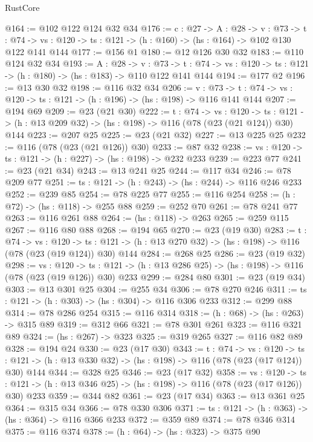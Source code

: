 \begin{lexlean}{RustCore}
\begin{coremodule}
@164 := @102 @122 @124 @32 @34
@176 := {c : @27} ->
  {A : @28} ->
  {v : @73} ->
  {t : @74} -> {vs : @120} -> {ts : @121} -> (h : @160) -> (hs : @164) -> @102 @130 @122 @141 @144
@177 := @156 @1
@180 := @12 @126 @30 @32
@183 := @110 @124 @32 @34
@193 := {A : @28} ->
  {v : @73} ->
  {t : @74} -> {vs : @120} -> {ts : @121} -> (h : @180) -> (hs : @183) -> @110 @122 @141 @144
@194 := @177 @2
@196 := @13 @30 @32
@198 := @116 @32 @34
@206 := {v : @73} ->
  {t : @74} -> {vs : @120} -> {ts : @121} -> (h : @196) -> (hs : @198) -> @116 @141 @144
@207 := @194 @69
@209 := @23 (@21 @30)
@222 := {t : @74} ->
  {vs : @120} ->
  {ts : @121} -> (h : @13 @209 @32) -> (hs : @198) -> @116 (@78 (@23 (@21 @124)) @30) @144
@223 := @207 @25
@225 := @23 (@21 @32)
@227 := @13 @225 @25
@232 := @116 (@78 (@23 (@21 @126)) @30)
@233 := @87 @32
@238 := {vs : @120} -> {ts : @121} -> (h : @227) -> (hs : @198) -> @232 @233
@239 := @223 @77
@241 := @23 (@21 @34)
@243 := @13 @241 @25
@244 := @117 @34
@246 := @78 @209 @77
@251 := {ts : @121} -> (h : @243) -> (hs : @244) -> @116 @246 @233
@252 := @239 @85
@254 := @78 @225 @77
@255 := @116 @254
@258 := (h : @72) -> (hs : @118) -> @255 @88
@259 := @252 @70
@261 := @78 @241 @77
@263 := @116 @261 @88
@264 := (hs : @118) -> @263
@265 := @259 @115
@267 := @116 @80 @88
@268 := @194 @65
@270 := @23 (@19 @30)
@283 := {t : @74} ->
  {vs : @120} ->
  {ts : @121} -> (h : @13 @270 @32) -> (hs : @198) -> @116 (@78 (@23 (@19 @124)) @30) @144
@284 := @268 @25
@286 := @23 (@19 @32)
@298 := {vs : @120} ->
  {ts : @121} -> (h : @13 @286 @25) -> (hs : @198) -> @116 (@78 (@23 (@19 @126)) @30) @233
@299 := @284 @80
@301 := @23 (@19 @34)
@303 := @13 @301 @25
@304 := @255 @34
@306 := @78 @270 @246
@311 := {ts : @121} -> (h : @303) -> (hs : @304) -> @116 @306 @233
@312 := @299 @88
@314 := @78 @286 @254
@315 := @116 @314
@318 := (h : @68) -> (hs : @263) -> @315 @89
@319 := @312 @66
@321 := @78 @301 @261
@323 := @116 @321 @89
@324 := (hs : @267) -> @323
@325 := @319 @265
@327 := @116 @82 @89
@328 := @194 @24
@330 := @23 (@17 @30)
@343 := {t : @74} ->
  {vs : @120} ->
  {ts : @121} -> (h : @13 @330 @32) -> (hs : @198) -> @116 (@78 (@23 (@17 @124)) @30) @144
@344 := @328 @25
@346 := @23 (@17 @32)
@358 := {vs : @120} ->
  {ts : @121} -> (h : @13 @346 @25) -> (hs : @198) -> @116 (@78 (@23 (@17 @126)) @30) @233
@359 := @344 @82
@361 := @23 (@17 @34)
@363 := @13 @361 @25
@364 := @315 @34
@366 := @78 @330 @306
@371 := {ts : @121} -> (h : @363) -> (hs : @364) -> @116 @366 @233
@372 := @359 @89
@374 := @78 @346 @314
@375 := @116 @374
@378 := (h : @64) -> (hs : @323) -> @375 @90

\end{coremodule}
\end{lexlean}
